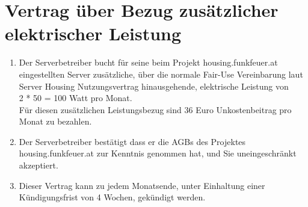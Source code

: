 \documentclass[parskip=half]{scrreprt}
\begin{document}
\chapter*{Vertrag über Bezug zusätzlicher elektrischer Leistung}


\begin{contract}
\begin{enumerate}
\item Der Serverbetreiber bucht für seine beim Projekt housing.funkfeuer.at eingestellten Server zusätzliche, über die normale Fair-Use Vereinbarung laut Server Housing Nutzungsvertrag hinausgehende, elektrische Leistung von
\vspace{0.2cm}\\
\hspace*{3mm}2 * 50 = 100 Watt pro Monat.
\vspace{0.2cm}\\
Für diesen zusätzlichen Leistungsbezug sind 36 Euro Unkostenbeitrag pro Monat zu bezahlen.
\item Der Serverbetreiber bestätigt dass er die AGBs des Projektes housing.funkfeuer.at zur Kenntnis genommen hat, und Sie uneingeschränkt akzeptiert.
\item Dieser Vertrag kann zu jedem Monatsende, unter Einhaltung einer Kündigungsfrist von 4 Wochen, gekündigt werden.
\end{enumerate}
\end{contract}


\end{document}
